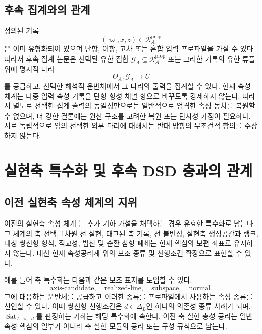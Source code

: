 \documentclass[11pt]{article}
\newcommand{\Dep}{\Delta_{L}}
\newcommand{\Sat}{\operatorname{Sat}}
\newcommand{\PropRec}{\mathcal R^{\mathrm{prop}}}
\theoremstyle{definition}
\theoremstyle{remark}
\begin{document}
\subsection{후속 집계와의 관계}

정의된 기록
\[
(\varpi,x,z)\in\PropRec_A
\]
은 이미 유형화되어 있으며 단항, 이항, 고차 또는 혼합 입력 프로파일을 가질 수 있다.
따라서 후속 집계 논문은 선택된 유한 집합 \(\mathcal G_A\subseteq\PropRec_A\) 또는 그러한 기록의 유한 튜플 위에 명시적 다리
\[
\Theta_A:\mathcal G_A\longrightarrow U
\]
를 공급하고, 선택한 해석적 운반체에서 그 다리의 출력을 집계할 수 있다.
현재 속성 체계는 다중 입력 속성 기록을 단항 형성 채널 항으로 바꾸도록 강제하지 않는다.
따라서 별도로 선택한 집계 출력의 동일성만으로는 일반적으로 엄격한 속성 동치를 복원할 수 없으며, 더 강한 결론에는 원천 구조를 고려한 복원 또는 단사성 가정이 필요하다.
서로 독립적으로 임의 선택한 외부 다리에 대해서는 반대 방향의 무조건적 함의를 주장하지 않는다.

\section{실현축 특수화 및 후속 DSD 층과의 관계}
\label{sec:specialization}

\subsection{이전 실현축 속성 체계의 지위}

이전의 실현축 속성 체계 \cite{KwonAxisProperty}는 추가 기하 가설을 채택하는 경우 유효한 특수화로 남는다.
그 체계의 축 선택, 1차원 선 실현, 태그된 축 기록, 선 불변성, 실현축 생성공간과 랭크, 대칭 쌍선형 형식, 직교성, 법선 및 순환 삼항 폐쇄는 현재 핵심의 보편 좌표로 유지하지 않는다.
대신 현재 속성공리계 위의 보조 종류 및 선행조건 확장으로 표현할 수 있다.

예를 들어 축 특수화는 다음과 같은 보조 표지를 도입할 수 있다.
\[
\mathrm{axis\mbox{-}candidate},\quad
\mathrm{realized\mbox{-}line},\quad
\mathrm{subspace},\quad
\mathrm{normal}.
\]
그에 대응하는 운반체를 공급하고 이러한 종류를 프로파일에서 사용하는 속성 종류를 선언할 수 있다.
이때 쌍선형 선행조건은 \(d\in\Dep\)인 하나의 의존성 종류 사례가 되며, \(\Sat_{A,\varpi,d}\)를 판정하는 기하는 해당 특수화에 속한다.
이전 축 실현 총성 공리는 일반 속성 핵심의 일부가 아니라 축 실현 모듈의 공리 또는 구성 규칙으로 남는다.
\end{document}
